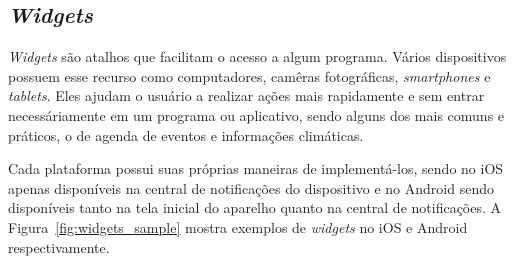 \begin{comment}
\subsection{Acessibilidade} \label{subsec:acessibilidade}
Não se pode deixar de lado uma grande parcela da população que possui algum tipo de deficiência na hora de planejar novos sistemas e 
aplicativos. Cada plataforma possui seus próprios recursos para auxiliar pessoas com 
deficiência a utilizar os \textit{smartphones} e também possuem \textit{SDKs} que os desenvolvedores podem utilizar para deixar os 
aplicativos usáveis para todos. No iOS existem muitos recursos disponíveis como VoiceOver, 
Ditado e a própria Siri\footnote{\url{http://www.apple.com/br/accessibility/ios}}. No Android exite o TalkBack, BrailleBack e Acesso 
por voz\footnote{\url{https://support.google.com/accessibility/android}}. 

Importante ressaltar que os aplicativos aliados às tecnologias presentes nos \textit{smartphones} podem ajudar pessoas com deficiência 
a serem incluídas socialmente, a viverem melhor e até mesmo ajudar na reabilitação 
já que alguns aplicativos são usados para fisioterapia e aprendizado diferenciado como no caso de pessoas com autismo ou daltonismo.

https://github.com/phonegap/phonegap-mobile-accessibility
https://github.com/driftyco/ionic/issues/4100

\end{comment} 
 
\subsection{\textit{Widgets}} \label{subsec:widgets}
\textit{Widgets} são atalhos que facilitam o acesso a algum programa. Vários dispositivos possuem esse recurso como computadores, camêras fotográficas, \textit{smartphones} e \textit{tablets}. Eles ajudam o usuário a 
realizar ações mais rapidamente e sem entrar necessáriamente em um programa ou aplicativo, sendo alguns dos mais comuns e práticos, o de agenda de eventos e informações climáticas.

Cada plataforma possui suas próprias maneiras de implementá-los, sendo no iOS apenas disponíveis na central de notificações do dispositivo e no Android sendo disponíveis tanto na tela inicial do aparelho quanto na central 
de notificações. A Figura~\ref{fig:widgets_sample} mostra exemplos de \textit{widgets} no iOS e Android respectivamente.

